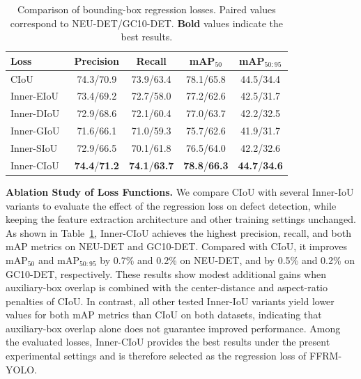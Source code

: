 \documentclass[pdflatex,sn-nature]{sn-jnl}
\begin{document}
\begin{table}[!t]
    \centering
    \caption{Comparison of bounding-box regression losses. Paired values correspond to NEU-DET/GC10-DET. \textbf{Bold} values indicate the best results.}
    \label{tab:loss}
    \footnotesize
    \setlength{\tabcolsep}{3pt}
    \renewcommand{\arraystretch}{1.15}
    \begin{tabular*}{\textwidth}
    {@{\extracolsep{\fill}}lcccc@{}}
    \toprule
    \textbf{Loss} &
    \textbf{Precision} &
    \textbf{Recall} &
    \textbf{mAP$_{50}$} &
    \textbf{mAP$_{50:95}$} \\
    \midrule
    CIoU~\cite{Zheng2020distance}
    & 74.3/70.9
    & 73.9/63.4
    & 78.1/65.8
    & 44.5/34.4 \\

    Inner-EIoU~\cite{Zhang2023InnerIoU}
    & 73.4/69.2
    & 72.7/58.0
    & 77.2/62.6
    & 42.5/31.7 \\

    Inner-DIoU~\cite{Zhang2023InnerIoU}
    & 72.9/68.6
    & 72.1/60.4
    & 77.0/63.7
    & 42.2/32.5 \\

    Inner-GIoU~\cite{Zhang2023InnerIoU}
    & 71.6/66.1
    & 71.0/59.3
    & 75.7/62.6
    & 41.9/31.7 \\

    Inner-SIoU~\cite{Zhang2023InnerIoU}
    & 72.9/66.5
    & 70.1/61.8
    & 76.5/64.0
    & 42.2/32.6 \\
    \midrule
    Inner-CIoU~\cite{Zhang2023InnerIoU}
    & \textbf{74.4}/\textbf{71.2}
    & \textbf{74.1}/\textbf{63.7}
    & \textbf{78.8}/\textbf{66.3}
    & \textbf{44.7}/\textbf{34.6} \\
    \bottomrule
    \end{tabular*}
\end{table}

\noindent\textbf{Ablation Study of Loss Functions.}
We compare CIoU with several Inner-IoU variants to evaluate the effect of the regression loss on defect detection, while keeping the feature extraction architecture and other training settings unchanged. As shown in Table~\ref{tab:loss}, Inner-CIoU achieves the highest precision, recall, and both mAP metrics on NEU-DET and GC10-DET. Compared with CIoU, it improves $\mathrm{mAP}_{50}$ and $\mathrm{mAP}_{50:95}$ by 0.7\% and 0.2\% on NEU-DET, and by 0.5\% and 0.2\% on GC10-DET, respectively. These results show modest additional gains when auxiliary-box overlap is combined with the center-distance and aspect-ratio penalties of CIoU. In contrast, all other tested Inner-IoU variants yield lower values for both mAP metrics than CIoU on both datasets, indicating that auxiliary-box overlap alone does not guarantee improved performance. Among the evaluated losses, Inner-CIoU provides the best results under the present experimental settings and is therefore selected as the regression loss of FFRM-YOLO.
\end{document}
